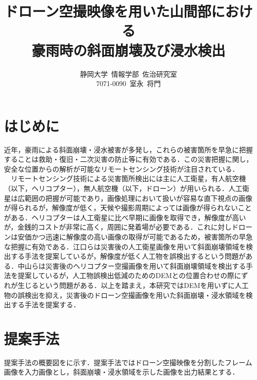 \documentclass[a4paper, twocolumn, xelatex, 10pt, ja=standard, Ligatures=TeX]{bxjsarticle}
\title{\LARGE ドローン空撮映像を用いた山間部における \\ 豪雨時の斜面崩壊及び浸水検出}
\author{静岡大学\ 情報学部\ 佐治研究室 \\ 7071-0090\ 室永\ 将門}
\date{}
\begin{document}
	
	\maketitle

	\section{はじめに}
		近年，豪雨による斜面崩壊・浸水被害が多発し，これらの被害箇所を早急に把握することは救助・復旧・二次災害の防止等に有効である．この災害把握に関し，安全な位置からの解析が可能なリモートセンシング技術が注目されている．\\
		　リモートセンシング技術による災害箇所検出には主に人工衛星，有人航空機（以下，ヘリコプター），無人航空機（以下，ドローン）が用いられる．人工衛星は広範囲の把握が可能であり，画像処理において扱いが容易な直下視点の画像が得られるが，解像度が低く，天候や撮影周期によっては画像が得られないことがある．ヘリコプターは人工衛星に比べ早期に画像を取得でき，解像度が高いが，金銭的コストが非常に高く，周囲に発着場が必要である．これに対しドローンは安価かつ迅速に解像度の高い画像の取得が可能であるため，被害箇所の早急な把握に有効である．江口ら\cite{art01}は災害後の人工衛星画像を用いて斜面崩壊領域を検出する手法を提案しているが，解像度が低く人工物を誤検出するという問題がある．中山\cite{art02}らは災害後のヘリコプター空撮画像を用いて斜面崩壊領域を検出する手法を提案しているが，人工物誤検出低減のためのDEMとの位置合わせの際にずれが生じるという問題がある．以上を踏まえ，本研究ではDEMを用いずに人工物の誤検出を抑え，災害後のドローン空撮画像を用いた斜面崩壊・浸水領域を検出する手法を提案する．
		

	\section{提案手法}
		提案手法の概要図をに示す．提案手法ではドローン空撮映像を分割したフレーム画像を入力画像とし，斜面崩壊・浸水領域を示した画像を出力結果とする．
	
		
\end{document}
